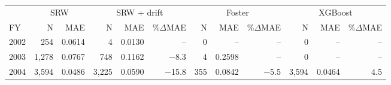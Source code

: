\begin{tabular}{l rr rrr rrr rrr}
\toprule
& \multicolumn{2}{c}{SRW} & \multicolumn{3}{c}{SRW + drift} & \multicolumn{3}{c}{Foster} & \multicolumn{3}{c}{XGBoost} \\
\cmidrule(lr){2-3}\cmidrule(lr){4-6}\cmidrule(lr){7-9}\cmidrule(lr){10-12}
FY & N & MAE & N & MAE & \%$\Delta$MAE & N & MAE & \%$\Delta$MAE & N & MAE & \%$\Delta$MAE \\
\midrule
2002 & 254 & 0.0614 & 4 & 0.0130 & -- & 0 & -- & -- & 0 & -- & -- \\
2003 & 1,278 & 0.0767 & 748 & 0.1162 & $-$8.3 & 4 & 0.2598 & -- & 0 & -- & -- \\
2004 & 3,594 & 0.0486 & 3,225 & 0.0590 & $-$15.8 & 355 & 0.0842 & $-$5.5 & 3,594 & 0.0464 & 4.5 \\
\bottomrule
\end{tabular}

